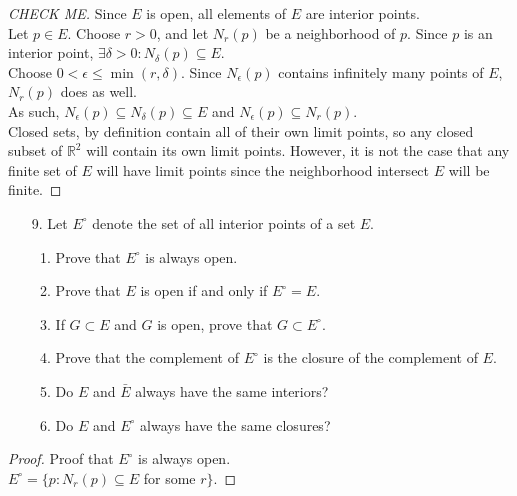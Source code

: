 \documentclass[10pt]{article}
\theoremstyle{definition}
\theoremstyle{plain}
\newcommand{\R}{\mathbb{R}}
\begin{document}
\begin{proof}[CHECK ME]
Since $E$ is open, all elements of $E$ are interior points. \\

Let $p\in E$. Choose $r>0$, and let $N_r(p)$ be a neighborhood of $p$. Since $p$ is an interior point, $\exists \delta > 0: N_\delta (p) \subseteq E$. \\

Choose $0<\epsilon \leq \min(r,\delta)$. Since $N_\epsilon (p)$ contains infinitely many points of $E$, $N_r(p)$ does as well. \\

As such, $N_\epsilon (p) \subseteq N_\delta (p) \subseteq E$ and $N_\epsilon (p) \subseteq N_r (p)$. \\

Closed sets, by definition contain all of their own limit points, so any closed subset of $\R^2$ will contain its own limit points. However, it is not the case that any finite set of $E$ will have limit points since the neighborhood intersect $E$ will be finite.
\end{proof}




\pagebreak




\begin{enumerate}
\item[9.] Let $E^\circ$ denote the set of all interior points of a set $E$.
\begin{enumerate}
  \item Prove that $E^\circ$ is always open.
  \item Prove that $E$ is open if and only if $E^\circ = E$.
  \item If $G \subset E$ and $G$ is open, prove that $G\subset E^\circ$.
  \item Prove that the complement of $E^\circ$ is the closure of the complement of $E$.
  \item Do $E$ and $\bar{E}$ always have the same interiors?
  \item Do $E$ and $E^\circ$ always have the same closures?
\end{enumerate}
\end{enumerate}

\begin{proof}
Proof that $E^\circ$ is always open. \\

$E^\circ = \{p: N_r(p) \subseteq E$ for some $r\}$.
\end{proof}
\end{document}
